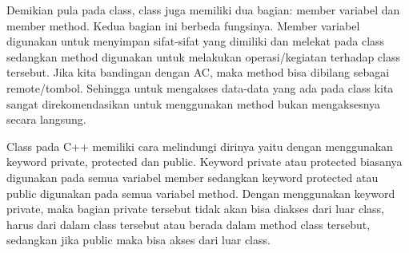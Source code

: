 Demikian pula pada class, class juga memiliki dua bagian: member
variabel dan member method. Kedua bagian ini berbeda fungsinya. Member
variabel digunakan untuk menyimpan sifat-sifat yang dimiliki dan melekat
pada class sedangkan method digunakan untuk melakukan operasi/kegiatan
terhadap class tersebut. Jika kita bandingan dengan AC, maka method bisa
dibilang sebagai remote/tombol. Sehingga untuk mengakses data-data yang
ada pada class kita sangat direkomendasikan untuk menggunakan method
bukan mengaksesnya secara langsung.

Class pada C++ memiliki cara melindungi dirinya yaitu dengan menggunakan
keyword private, protected dan public. Keyword private atau protected
biasanya digunakan pada semua variabel member sedangkan keyword
protected atau public digunakan pada semua variabel method. Dengan
menggunakan keyword private, maka bagian private tersebut tidak akan
bisa diakses dari luar class, harus dari dalam class tersebut atau
berada dalam method class tersebut, sedangkan jika public maka bisa
akses dari luar class.

